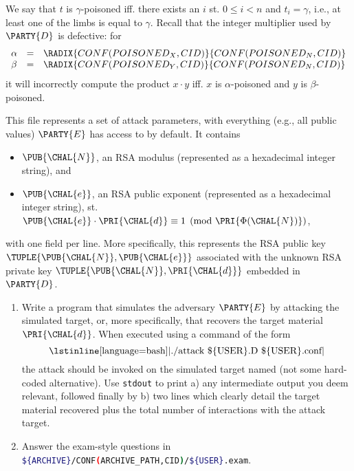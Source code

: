 \documentclass[crop={false},multi={true},tikz={true}]{standalone}
\begin{document}
\begin{itemize}
\[      \]
      We say that $t$ is $\gamma$-poisoned iff. there exists an $i$ st.
      $0 \leq i < n$ and $t_i = \gamma$, i.e., at least one of the limbs 
      is equal to $\gamma$.  Recall that the integer multiplier used by
      $\PARTY{D}$ is defective: for
      \[
      \begin{array}{lcl}
      \alpha &=& \RADIX{CONF(POISONED_X,CID)}{CONF(POISONED_N,CID)} \\
      \beta  &=& \RADIX{CONF(POISONED_Y,CID)}{CONF(POISONED_N,CID)} \\
      \end{array}
      \]
      it will incorrectly compute the product $x \cdot y$ iff. $x$ is 
      $\alpha$-poisoned and $y$ is $\beta$-poisoned.
\end{itemize}


This file represents a set of attack parameters, with everything (e.g.,
all public values) $\PARTY{E}$ has access to by default.  It contains 

\begin{itemize}
\item $\PUB{\CHAL{N}}$,
      an RSA modulus
      (represented as a                   hexadecimal integer string),
      and
\item $\PUB{\CHAL{e}}$,
      an RSA public exponent
      (represented as a                   hexadecimal integer string),
      st. $\PUB{\CHAL{e}} \cdot \PRI{\CHAL{d}} \equiv 1 \pmod{\PRI{\Phi(\CHAL{N})}}$,
\end{itemize}

\noindent
with one field per line.
More specifically, this represents the RSA public key 
$
\TUPLE{ \PUB{\CHAL{N}}, \PUB{\CHAL{e}} }
$
associated with the unknown RSA private key 
$
\TUPLE{ \PUB{\CHAL{N}}, \PRI{\CHAL{d}} }
$
embedded in $\PARTY{D}$.


\begin{enumerate}
\item Write a program that simulates the adversary $\PARTY{E}$ by attacking
      the simulated target, or, more specifically, that recovers the target 
      material $\PRI{\CHAL{d}}$.  
      When executed using a command of the form
      \[
      \mbox{\lstinline[language={bash}]|./attack \$\{USER\}.D \$\{USER\}.conf|}
      \]
      the attack should be invoked on the simulated target named (not some
      hard-coded alternative).  Use \lstinline[language={bash}]{stdout} to 
      print 
      a) any intermediate output you deem relevant, followed finally by 
      b) two lines which clearly detail the target material recovered plus
         the total number of interactions with the attack target.
\item Answer the exam-style questions in  
      \lstinline[language={bash}]|${ARCHIVE}/CONF(ARCHIVE_PATH,CID)/${USER}.exam|.
\end{enumerate}
\end{document}
